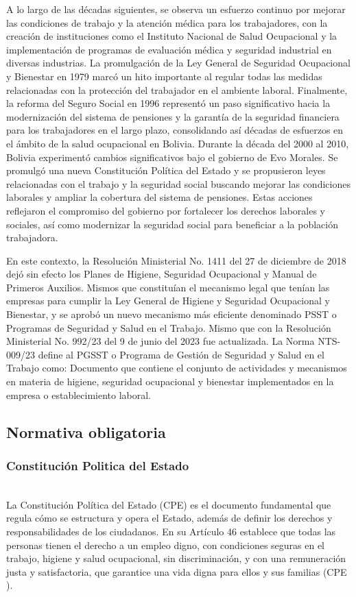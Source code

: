 A lo largo de las décadas siguientes, se observa un esfuerzo continuo por mejorar las condiciones de trabajo y la atención médica para los trabajadores, con la creación de instituciones como el Instituto Nacional de Salud Ocupacional y la implementación de programas de evaluación médica y seguridad industrial en diversas industrias.
La promulgación de la Ley General de Seguridad Ocupacional y Bienestar en 1979 marcó un hito importante al regular todas las medidas relacionadas con la protección del trabajador en el ambiente laboral.
Finalmente, la reforma del Seguro Social en 1996 representó un paso significativo hacia la modernización del sistema de pensiones y la garantía de la seguridad financiera para los trabajadores en el largo plazo, consolidando así décadas de esfuerzos en el ámbito de la salud ocupacional en Bolivia.
Durante la década del 2000 al 2010, Bolivia experimentó cambios significativos bajo el gobierno de Evo Morales. Se promulgó una nueva Constitución Política del Estado y se propusieron leyes relacionadas con el trabajo y la seguridad social buscando mejorar las condiciones laborales y ampliar la cobertura del sistema de pensiones. Estas acciones reflejaron el compromiso del gobierno por fortalecer los derechos laborales y sociales, así como modernizar la seguridad social para beneficiar a la población trabajadora.

En este contexto, la Resolución Ministerial No. 1411 del 27 de diciembre de 2018 dejó sin efecto los Planes de Higiene, Seguridad Ocupacional y Manual de Primeros Auxilios. Mismos que constituían el mecanismo legal que tenían las empresas para cumplir la Ley General de Higiene y Seguridad Ocupacional y Bienestar, y se aprobó un nuevo mecanismo más eficiente denominado PSST o Programas de Seguridad y Salud en el Trabajo.
Mismo que con la Resolución Ministerial No. 992/23 del 9 de junio del 2023 fue actualizada. La Norma NTS-009/23 define al PGSST o Programa de Gestión de Seguridad y Salud en el Trabajo como: Documento que contiene el conjunto de actividades y mecanismos en materia de higiene, seguridad ocupacional y bienestar implementados en la empresa o establecimiento laboral.
\subsection{Normativa obligatoria}

\subsubsection{Constitución Politica del Estado}\hfill\\
\indent
La Constitución Política del Estado (CPE) es el documento fundamental que regula cómo se estructura y opera el Estado, además de definir los derechos y responsabilidades de los ciudadanos. En su Artículo 46 establece que todas las personas tienen el derecho a un empleo digno, con condiciones seguras en el trabajo, higiene y salud ocupacional, sin discriminación, y con una remuneración justa y satisfactoria, que garantice una vida digna para ellos y sus familias (CPE \citeyear{CPE}).

